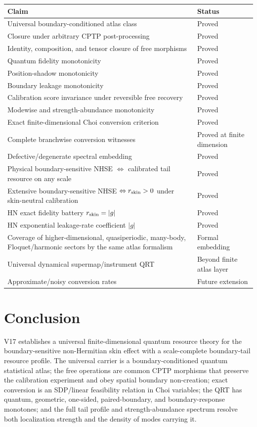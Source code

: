 \documentclass[11pt]{article}
\begin{document}
\begin{center}
\small
\begin{tabular}{@{}p{}p{}@{}}
\toprule
Claim & Status\\
\midrule
Universal boundary-conditioned atlas class & Proved\\
Closure under arbitrary CPTP post-processing & Proved\\
Identity, composition, and tensor closure of free morphisms & Proved\\
Quantum fidelity monotonicity & Proved\\
Position-shadow monotonicity & Proved\\
Boundary leakage monotonicity & Proved\\
Calibration score invariance under reversible free recovery & Proved\\
Modewise and strength-abundance monotonicity & Proved\\
Exact finite-dimensional Choi conversion criterion & Proved\\
Complete branchwise conversion witnesses & Proved at finite dimension\\
Defective/degenerate spectral embedding & Proved\\
Physical boundary-sensitive NHSE $\Leftrightarrow$ calibrated tail resource on any scale & Proved\\
Extensive boundary-sensitive NHSE $\Leftrightarrow r_{\rm skin}>0$ under skin-neutral calibration & Proved\\
HN exact fidelity battery $r_{\rm skin}=|g|$ & Proved\\
HN exponential leakage-rate coefficient $|g|$ & Proved\\
Coverage of higher-dimensional, quasiperiodic, many-body, Floquet/harmonic sectors by the same atlas formalism & Formal embedding\\
Universal dynamical supermap/instrument QRT & Beyond finite atlas layer\\
Approximate/noisy conversion rates & Future extension\\
\bottomrule
\end{tabular}
\end{center}

\section{Conclusion}

V17 establishes a universal finite-dimensional quantum resource theory for the boundary-sensitive non-Hermitian skin effect with a scale-complete boundary-tail resource profile. The universal carrier is a boundary-conditioned quantum statistical atlas; the free operations are common CPTP morphisms that preserve the calibration experiment and obey spatial boundary non-creation; exact conversion is an SDP/linear feasibility relation in Choi variables; the QRT has quantum, geometric, one-sided, paired-boundary, and boundary-response monotones; and the full tail profile and strength-abundance spectrum resolve both localization strength and the density of modes carrying it.
\end{document}
